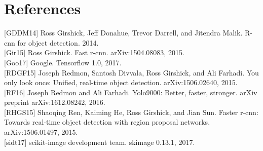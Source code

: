 \documentclass[11pt]{article}
\begin{document}
    \section{References}\label{references}

{[}GDDM14{]} Ross Girshick, Jeff Donahue, Trevor Darrell, and Jitendra
Malik. R-cnn for object detection. 2014.\\

{[}Gir15{]} Ross Girshick. Fast r-cnn. arXiv:1504.08083, 2015.\\

{[}Goo17{]} Google. Tensorflow 1.0, 2017.\\

{[}RDGF15{]} Joseph Redmon, Santosh Divvala, Ross Girshick, and Ali
Farhadi. You only look once: Unified, real-time object detection.
arXiv:1506.02640, 2015.\\

{[}RF16{]} Joseph Redmon and Ali Farhadi. Yolo9000: Better, faster,
stronger. arXiv preprint arXiv:1612.08242, 2016.\\

{[}RHGS15{]} Shaoqing Ren, Kaiming He, Ross Girshick, and Jian Sun.
Faster r-cnn: Towards real-time object detection with region proposal
networks. arXiv:1506.01497, 2015.\\

{[}sidt17{]} scikit-image development team. skimage 0.13.1, 2017.


    
    
    
    
\end{document}
